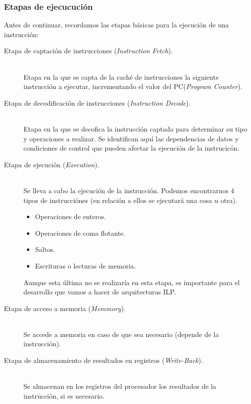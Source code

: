 \subsubsection{Etapas de ejecucución}
Antes de continuar, recordamos las etapas básicas para la ejecución de una instrucción:
\begin{description}
    \item [Etapa de captación de instrucciones (\emph{Instruction Fetch}).]~\\
        Etapa en la que se capta de la caché de instrucciones la siguiente instrucción a ejecutar, incrementando el valor del PC\@ (\emph{Program Counter}).
    \item [Etapa de decodificación de instrucciones (\emph{Instruction Decode}).]~\\
        Etapa en la que se decofica la instrucción captada para determinar su tipo y operaciones a realizar. Se identifican aquí las dependencias de datos y condiciones de control que pueden afectar la ejecución de la instrucicón.
    \item [Etapa de ejecución (\emph{Execution}).]~\\
        Se lleva a cabo la ejecución de la instrucción. Podemos encontrarnos 4 tipos de instrucciónes (en relación a ellos se ejecutará una cosa u otra).
        \begin{itemize}
            \item Operaciones de enteros.
            \item Operaciones de coma flotante.
            \item Saltos.
            \item Escrituras o lecturas de memoria.
        \end{itemize}
        Aunque esta última no se realizaría en esta etapa, es importante para el desarrollo que vamos a hacer de arquitecturas ILP\@.
    \item [Etapa de acceso a memoria (\emph{Memmory}).]~\\
        Se accede a memoria en caso de que sea necesario (depende de la instrucción).
    \item [Etapa de almacenamiento de resultados en registros (\emph{Write-Back}).]~\\
        Se almacenan en los registros del procesador los resultados de la instrucción, si es necesario.
\end{description}

